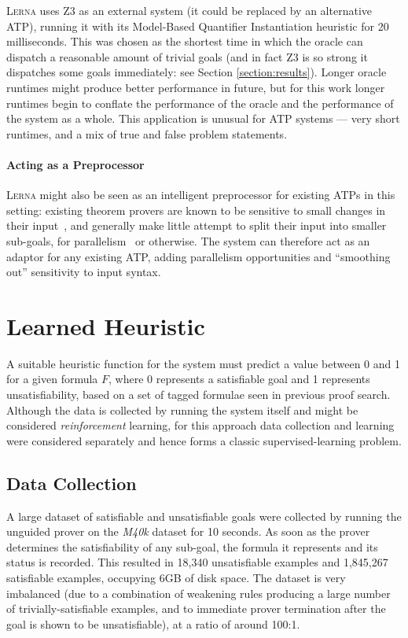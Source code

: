 \documentclass{llncs}
\newcommand{\lerna}{\textsc{Lerna}}
\newcommand{\z}[1]{\textsc{Z3}}
\newcommand{\mizarlarge}{\textit{M40k}}
\begin{document}
\lerna{} uses \z3{} as an external system (it could be replaced by an alternative ATP), running it with its Model-Based Quantifier Instantiation heuristic for 20 milliseconds. 
%
This was chosen as the shortest time in which the oracle can dispatch a reasonable amount of trivial goals (and in fact \z3{} is so strong it dispatches some goals immediately: see Section \ref{section:results}).
Longer oracle runtimes might produce better performance in future, but for this work longer runtimes begin to conflate the performance of the oracle and the performance of the system as a whole.
This application is unusual for ATP systems --- very short runtimes, and a mix of true and false problem statements.

\paragraph{Acting as a Preprocessor}
\lerna{} might also be seen as an intelligent preprocessor for existing ATPs in this setting: existing theorem provers are known to be sensitive to small changes in their input~\cite{clausification}, and generally make little attempt to split their input into smaller sub-goals, for parallelism~\cite{parallel} or otherwise.
The system can therefore act as an adaptor for any existing ATP, adding parallelism opportunities and ``smoothing out'' sensitivity to input syntax.

\section{Learned Heuristic}
\label{section:heuristic}
A suitable heuristic function for the system must predict a value between 0 and 1 for a given formula \(F\), where 0 represents a satisfiable goal and 1 represents unsatisfiability, based on a set of tagged formulae seen in previous proof search.
Although the data is collected by running the system itself and might be considered \emph{reinforcement} learning, for this approach data collection and learning were considered separately and hence forms a classic supervised-learning problem.

\subsection{Data Collection}
A large dataset of satisfiable and unsatisfiable goals were collected by running the unguided prover on the \mizarlarge{} dataset for 10 seconds.
As soon as the prover determines the satisfiability of any sub-goal, the formula it represents and its status is recorded.
This resulted in 18,340 unsatisfiable examples and 1,845,267 satisfiable examples, occupying 6GB of disk space.
The dataset is very imbalanced (due to a combination of weakening rules producing a large number of trivially-satisfiable examples, and to immediate prover termination after the goal is shown to be unsatisfiable), at a ratio of around 100:1.
\end{document}
